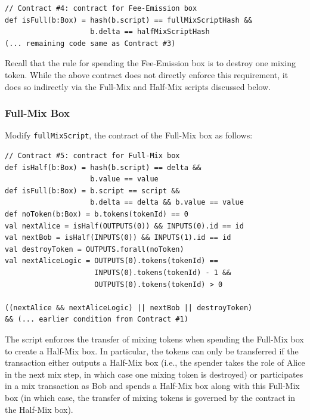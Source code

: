 \documentclass[11pt]{article}
\begin{document}
{\small
\begin{Verbatim}[frame=single]
// Contract #4: contract for Fee-Emission box
def isFull(b:Box) = hash(b.script) == fullMixScriptHash && 
                    b.delta == halfMixScriptHash
(... remaining code same as Contract #3)                    
\end{Verbatim}
}

Recall that the rule for spending the Fee-Emission box is to destroy one mixing token. While the above contract does not directly enforce this requirement, it does so indirectly via the Full-Mix and Half-Mix scripts discussed below.

\subsubsection{Full-Mix Box}

Modify \texttt{fullMixScript}, the contract of the Full-Mix box as follows: 
{\small
\begin{Verbatim}[frame=single]
// Contract #5: contract for Full-Mix box
def isHalf(b:Box) = hash(b.script) == delta && 
                    b.value == value
def isFull(b:Box) = b.script == script &&
                    b.delta == delta && b.value == value
def noToken(b:Box) = b.tokens(tokenId) == 0
val nextAlice = isHalf(OUTPUTS(0)) && INPUTS(0).id == id
val nextBob = isHalf(INPUTS(0)) && INPUTS(1).id == id
val destroyToken = OUTPUTS.forall(noToken)
val nextAliceLogic = OUTPUTS(0).tokens(tokenId) == 
                     INPUTS(0).tokens(tokenId) - 1 && 
                     OUTPUTS(0).tokens(tokenId) > 0

((nextAlice && nextAliceLogic) || nextBob || destroyToken) 
&& (... earlier condition from Contract #1)
\end{Verbatim}
}

The script enforces the transfer of mixing tokens when spending the Full-Mix box to create a Half-Mix box. In particular, the tokens can only be transferred if the transaction either outputs a Half-Mix box (i.e., the spender takes the role of Alice in the next mix step, in which case one mixing token is destroyed) or participates in a mix transaction as Bob and spends a Half-Mix box along with this Full-Mix box (in which case, the transfer of mixing tokens is governed by the contract in the Half-Mix box).
\end{document}
